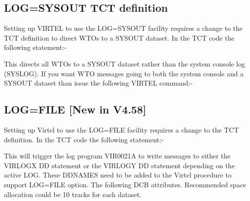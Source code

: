 \documentclass[letterpaper,10pt,english]{sphinxmanual}
\begin{document}
\subsection{LOG=SYSOUT TCT definition}
\label{\detokenize{audit_operations_ and_performance:log-sysout-tct-definition}}
Setting up VIRTEL to use the LOG=SYSOUT facility requires a change to the TCT definition to direct WTOs to a SYSOUT dataset. In the TCT code the following statement:-

\begin{sphinxVerbatim}[commandchars=\\\{\}]
\PYG{p}{[}\PYG{p}{[}\PYG{p}{]}\PYG{p}{]}

  
\end{sphinxVerbatim}

\newpage

This directs all WTOs to a SYSOUT dataset rather than the system console log (SYSLOG). If you want WTO messages going to both the system console and a SYSOUT dataset than issue the following VIRTEL command:-

\begin{sphinxVerbatim}[commandchars=\\\{\}]
 
\end{sphinxVerbatim}


\subsection{LOG=FILE {[}New in V4.58{]}}
\label{\detokenize{audit_operations_ and_performance:log-file-new-in-v4-58}}
Setting up Virtel to use the LOG=FILE facility requires a change to the TCT definition. In the TCT code the following statement:-

\begin{sphinxVerbatim}[commandchars=\\\{\}]
\end{sphinxVerbatim}

This will trigger the log program VIR0021A to write messages to either the VIRLOGX DD statement or the VIRLOGY DD statement depending on the active LOG. These DDNAMES need to be added to the Virtel procedure to support LOG=FILE option. The following DCB attributes. Recommended space allocation could be 10 tracks for each dataset.
\end{document}
